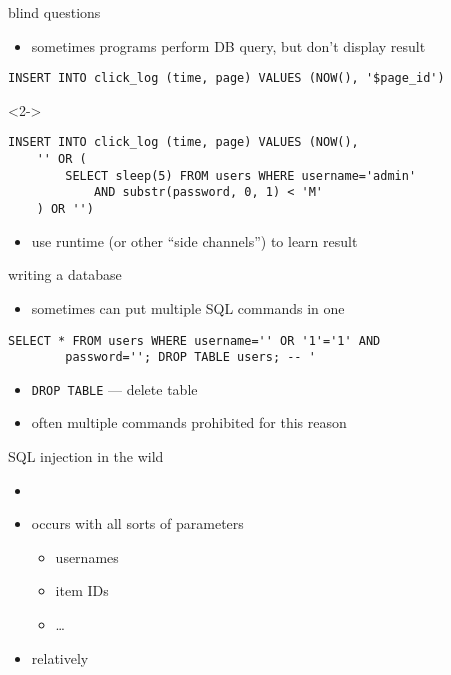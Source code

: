 \begin{frame}[fragile,label=blindQ]{blind questions}
    \begin{itemize}
    \item sometimes programs perform DB query, but don't display result
    \end{itemize}
\begin{verbatim}
INSERT INTO click_log (time, page) VALUES (NOW(), '$page_id')
\end{verbatim}
\begin{visibleenv}<2->
\begin{verbatim}
INSERT INTO click_log (time, page) VALUES (NOW(),
    '' OR (
        SELECT sleep(5) FROM users WHERE username='admin'
            AND substr(password, 0, 1) < 'M'
    ) OR '') 
\end{verbatim}
    \begin{itemize}
        \item use runtime (or other ``side channels'') to learn result
    \end{itemize}
\end{visibleenv}
\end{frame}

\begin{frame}[fragile,label=writingDB]{writing a database}
    \begin{itemize}
    \item sometimes can put multiple SQL commands in one
    \end{itemize}
\begin{verbatim}
SELECT * FROM users WHERE username='' OR '1'='1' AND
        password=''; DROP TABLE users; -- '
\end{verbatim}
    \begin{itemize}
    \item \texttt{DROP TABLE} --- delete table
    \item often multiple commands prohibited for this reason
    \end{itemize}
\end{frame}

\begin{frame}{SQL injection in the wild}
    \begin{itemize}
        \item {}
    \item occurs with all sorts of parameters
        \begin{itemize}
        \item usernames
        \item item IDs
        \item \ldots
        \end{itemize}
    \item relatively 
    \end{itemize}
\end{frame}


